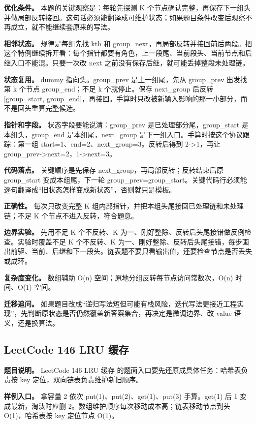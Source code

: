 \textbf{优化条件。} 本题的关键观察是：每轮先探测 K 个节点确认完整，再保存下一组头并做局部反转接回。这句话必须能翻译成可维护状态；如果题目条件改变后观察不再成立，就不能继续套原来的写法。

\textbf{相邻状态。} 规律是每组先找 kth 和 group\_next，再局部反转并接回前后两段。把这个特例继续拆开看：每个指针都要有角色，上一段尾、当前段头、当前节点和后继入口不能混。只要一次改 next 之前没有保存后继，就可能丢掉整段未处理链。

\textbf{状态复用。} dummy 指向头。group\_prev 是上一组尾，先从 group\_prev 出发找第 k 个节点 group\_end；不足 k 个就停止。保存 next\_group 后反转 [group\_start, group\_end]，再接回。手算时只改被新输入影响的那一小部分，而不是回头重算完整候选。

\textbf{指针和字段。} 状态字段要能说清：group\_prev 是已处理部分尾，group\_start 是本组头，group\_end 是本组尾，next\_group 是下一组入口。手算时按这个协议跟踪：第一组 start=1、end=2、next\_group=3。反转后得到 2->1，再让 group\_prev->next=2，1->next=3。

\textbf{代码落点。} 关键顺序是先保存 next\_group，再局部反转；反转结束后原 group\_start 变成本组尾，下一轮 group\_prev=group\_start。关键代码行必须能逐句翻译成“旧状态怎样变成新状态”，否则就只是模板。

\textbf{正确性。} 每次只改变完整 K 组内部指针，并把本组头尾接回已处理链和未处理链；不足 K 个节点不进入反转，符合题意。

\textbf{边界实验。} 先用不足 K 个不反转、K 为一、刚好整除、反转后头尾接错做反例检查。实验时覆盖不足 K 个不反转、K 为一、刚好整除、反转后头尾接错，每步画出前驱、当前、后继和下一段头。链表题不要只看输出值，还要检查节点是否丢失或成环。

\textbf{复杂度变化。} 数组辅助 O(n) 空间；原地分组反转每节点访问常数次，O(n) 时间、O(1) 空间。

\textbf{迁移追问。} 如果题目改成“递归写法短但可能有栈风险，迭代写法更接近工程实现”，先判断原状态是否仍然覆盖新答案集合，再决定是微调边界、改 value 语义，还是换算法。

\subsection{LeetCode 146 LRU 缓存}

\textbf{题目说明。} LeetCode 146 LRU 缓存 的题面入口要先还原成具体任务：哈希表负责按 key 定位，双向链表负责维护新旧顺序。

\textbf{样例入口。} 拿容量 2 依次 put(1)、put(2)、get(1)、put(3) 手算。get(1) 后 1 变成最新，淘汰时应删 2。数组维护顺序每次移动成本高；链表移动节点到头 O(1)，哈希表按 key 定位节点 O(1)。

